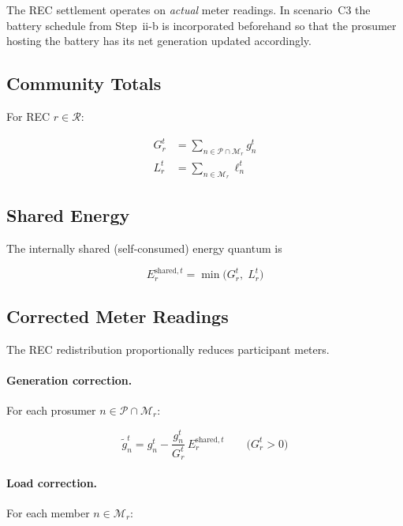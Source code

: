 \documentclass[12pt,a4paper]{article}
\begin{document}
The REC settlement operates on \emph{actual} meter readings.  In scenario~C3
the battery schedule from Step~ii-b is incorporated beforehand so that the
prosumer hosting the battery has its net generation updated accordingly.

\subsection{Community Totals}

For REC $r \in \mathcal{R}$:

\begin{align}
G_{r}^{t} &= \sum_{n \in \mathcal{P} \cap \mathcal{M}_{r}} g_{n}^{t}
\label{eq:rec_gen_total}\\
L_{r}^{t} &= \sum_{n \in \mathcal{M}_{r}} \ell_{n}^{t}
\label{eq:rec_load_total}
\end{align}

\subsection{Shared Energy}

The internally shared (self-consumed) energy quantum is

\begin{equation}
E_{r}^{\mathrm{shared},t} = \min\!\bigl(G_{r}^{t},\; L_{r}^{t}\bigr)
\label{eq:shared_energy}
\end{equation}

\subsection{Corrected Meter Readings}

The REC redistribution proportionally reduces participant meters.

\paragraph{Generation correction.}
For each prosumer $n \in \mathcal{P} \cap \mathcal{M}_{r}$:

\begin{equation}
\tilde{g}_{n}^{t} = g_{n}^{t}
  - \frac{g_{n}^{t}}{G_{r}^{t}}\,E_{r}^{\mathrm{shared},t}
  \qquad \bigl(G_{r}^{t} > 0\bigr)
\label{eq:gen_correction}
\end{equation}

\paragraph{Load correction.}
For each member $n \in \mathcal{M}_{r}$:
\end{document}
